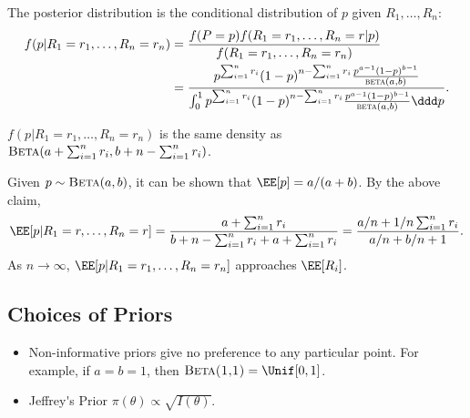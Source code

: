 The \ac{posterior distribution} is the conditional distribution of $p$ given $R_1, \hdots, R_n$:
\begin{align*}
    f(p|R_1=r_1, \hdots, R_n=r_n) &= \frac{f(P=p)f(R_1=r_1, \hdots, R_n=r|p)}{f(R_1=r_1, \hdots, R_n=r_n)} \\
    &= \frac{p^{\sum_{i=1}^n r_i}(1-p)^{n-\sum_{i=1}^nr_i} \frac{p^{a-1}(1-p)^{b-1}}{\textsc{beta}(a,b)}}{\int_{0}^1 p^{\sum_{i=1}^n r_i}(1-p)^{n-\sum_{i=1}^nr_i} \frac{p^{a-1}(1-p)^{b-1}}{\textsc{beta}(a,b)} \ddd p}.
\end{align*}

\begin{theorem}
\claimlabel

$f(p|R_1=r_1, \hdots, R_n=r_n)$ is the same density as $\textsc{Beta}(a+\sum_{i=1}^nr_i, b+n-\sum_{i=1}^nr_i)$. 
\end{theorem}

Given $p\sim \textsc{Beta}(a,b)$, it can be shown that $\EE[p] = a/(a+b)$. By the above claim, 
\[\EE[p|R_1=r, \hdots, R_n=r] = \frac{a + \sum_{i=1}^nr_i}{b+n-\sum_{i=1}^nr_i + a + \sum_{i=1}^nr_i} = \frac{a/n + 1/n\sum_{i=1}^nr_i}{a/n+b/n+1}.\]
As $n\rightarrow \infty$, $\EE[p|R_1=r_1, \hdots, R_n=r_n]$ approaches $\EE[R_i]$. 

\subsection{Choices of Priors}

\begin{itemize}
    \item \ac{Non-informative priors} give no preference to any particular point. For example, if $a=b=1$, then $\textsc{Beta(1,1)}=\Unif[0,1]$. 
    \item \ac{Jeffrey's Prior} $\pi(\theta)\propto \sqrt{I(\theta)}$. 
\end{itemize}